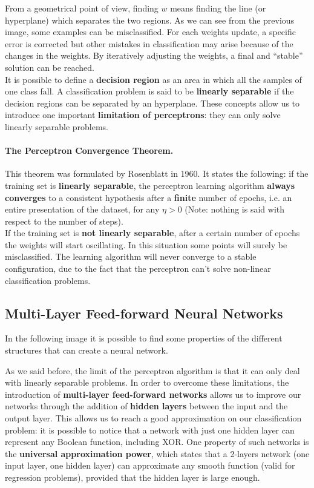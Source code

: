 
From a geometrical point of view, finding $w$ means finding the line (or hyperplane) which separates the two regions.
As we can see from the previous image, some examples can be misclassified. For each weights update, a specific error is corrected but other mistakes in classification may arise because of the changes in the weights. By iteratively adjusting the weights, a final and ``stable'' solution can be reached.\\
It is possible to define a \textbf{decision region} as an area in which all the samples of one class fall. A classification problem is said to be \textbf{linearly separable} if the decision regions can be separated by an hyperplane. These concepts allow us to introduce one important \textbf{limitation of perceptrons}: they can only solve linearly separable problems.

\paragraph*{The Perceptron Convergence Theorem.} This theorem was formulated by Rosenblatt in 1960. It states the following: if the training set is \textbf{linearly separable}, the perceptron learning algorithm \textbf{always converges} to a consistent hypothesis after a \textbf{finite} number of epochs, i.e. an entire presentation of the dataset, for any $\eta > 0$ (Note: nothing is said with respect to the number of steps).\\
If the training set is \textbf{not linearly separable}, after a certain number of epochs the weights will start oscillating. In this situation some points will surely be misclassified. The learning algorithm will never converge to a stable configuration, due to the fact that the perceptron can't solve non-linear classification problems.

\par \bigskip \noindent
\subsection{Multi-Layer Feed-forward Neural Networks}
In the following image it is possible to find some properties of the different structures that can create a neural network.


As we said before, the limit of the perceptron algorithm is that it can only deal with linearly separable problems. In order to overcome these limitations, the introduction of \textbf{multi-layer feed-forward networks} allows us to improve our networks through the addition of \textbf{hidden layers} between the input and the output layer. This allows us to reach a good approximation on our classification problem: it is possible to notice that a network with just one hidden layer can represent any Boolean function, including XOR. One property of such networks is the \textbf{universal approximation power}, which states that a 2-layers network (one input layer, one hidden layer) can approximate any smooth function (valid for regression problems), provided that the hidden layer is large enough.


